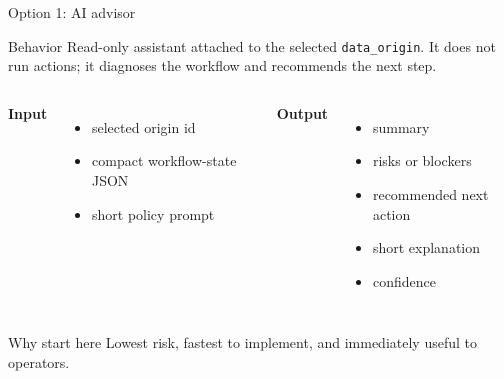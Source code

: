\documentclass[aspectratio=169,11pt]{beamer}
\newcommand{\code}[1]{\texttt{#1}}
\begin{document}
\begin{frame}{Option 1: AI advisor}
  \begin{block}{Behavior}
    Read-only assistant attached to the selected \code{data\_origin}. It does
    not run actions; it diagnoses the workflow and recommends the next step.
  \end{block}

  \begin{columns}[T]
    \textbf{Input}
    \begin{itemize}
      \item selected origin id
      \item compact workflow-state JSON
      \item short policy prompt
    \end{itemize}

    \textbf{Output}
    \begin{itemize}
      \item summary
      \item risks or blockers
      \item recommended next action
      \item short explanation
      \item confidence
    \end{itemize}
  \end{columns}

  \begin{block}{Why start here}
    Lowest risk, fastest to implement, and immediately useful to operators.
  \end{block}
\end{frame}
\end{document}
